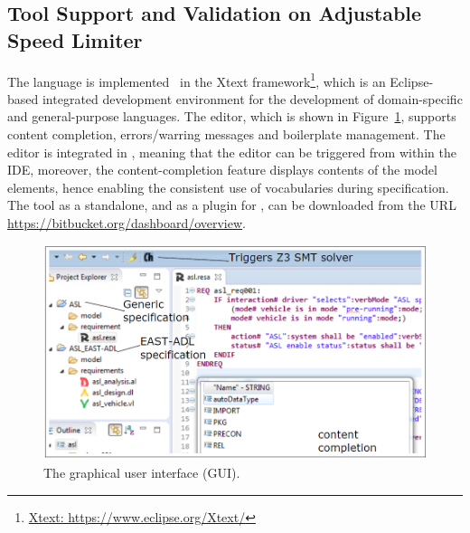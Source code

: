 \subsection*{Tool Support and Validation on Adjustable Speed Limiter}
The \resa{} language is implemented~\cite{resatool} in the Xtext framework\footnote{\url{Xtext: https://www.eclipse.org/Xtext/}}, which is an Eclipse-based integrated development environment for the development of domain-specific and general-purpose languages. The \resa{} editor, which is shown in Figure~\ref{fig_resagui}, supports content completion, errors/warring messages and boilerplate management. The editor is integrated in \eatop, meaning that the editor can be triggered from within the IDE, moreover, the content-completion feature displays contents of the \eastadl{} model elements, hence enabling the consistent use of vocabularies during specification. The \resa{} tool as a standalone, and as a plugin for \eatop{}, can be downloaded from the URL {\small \url{https://bitbucket.org/dashboard/overview}}. 
\begin{figure}[h]
	\centering
	\includegraphics[width=1\linewidth]{images/resagui}
	\caption{The \resa{} graphical user interface (GUI).}
	\label{fig_resagui}
\end{figure}

